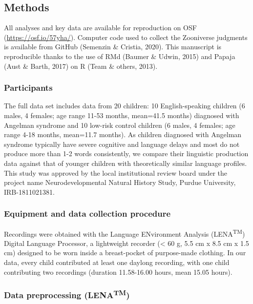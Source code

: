 \documentclass[english,,man]{apa6}
\begin{document}
\hypertarget{methods}{%
\subsection{Methods}\label{methods}}

All analyses and key data are available for reproduction on OSF (\url{https://osf.io/57yha/}). Computer code used to collect the Zooniverse judgments is available from GitHub (Semenzin \& Cristia, 2020). This manuscript is reproducible thanks to the use of RMd (Baumer \& Udwin, 2015) and Papaja (Aust \& Barth, 2017) on R (Team \& others, 2013).

\hypertarget{participants}{%
\subsubsection{Participants}\label{participants}}

The full data set includes data from 20 children: 10 English-speaking children (6 males, 4 females; age range 11-53 months, mean=41.5 months) diagnosed with Angelman syndrome and 10 low-risk control children (6 males, 4 females; age range 4-18 months, mean=11.7 months). As children diagnosed with Angelman syndrome typically have severe cognitive and language delays and most do not produce more than 1-2 words consistently, we compare their linguistic production data against that of younger children with theoretically similar language profiles. This study was approved by the local institutional review board under the project name Neurodevelopmental Natural History Study, Purdue University, IRB-1811021381.

\hypertarget{equipment-and-data-collection-procedure}{%
\subsubsection{Equipment and data collection procedure}\label{equipment-and-data-collection-procedure}}

Recordings were obtained with the Language ENvironment Analysis (LENA\textsuperscript{TM}) Digital Language Processor, a lightweight recorder (\textless{} 60 g, 5.5 cm x 8.5 cm x 1.5 cm) designed to be worn inside a breast-pocket of purpose-made clothing. In our data, every child contributed at least one daylong recording, with one child contributing two recordings (duration 11.58-16.00 hours, mean 15.05 hours).

\hypertarget{data-preprocessing-lenatm}{%
\subsubsection{\texorpdfstring{Data preprocessing (LENA\textsuperscript{TM})}{Data preprocessing (LENATM)}}\label{data-preprocessing-lenatm}}
\end{document}
